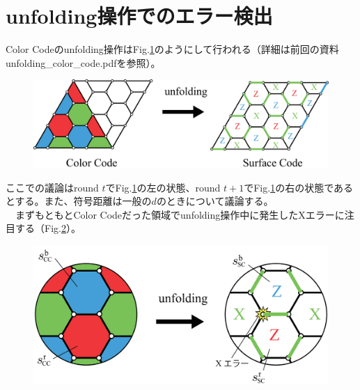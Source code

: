 \documentclass[a4paper,9pt]{ltjsarticle}
\begin{document}
\section{unfolding操作でのエラー検出}{
    Color Codeのunfolding操作はFig.\ref{figure2}のようにして行われる（詳細は前回の資料unfolding\_color\_code.pdfを参照）。

    \begin{figure}[h]
        \centering
        \includegraphics[scale=0.2]{figure/figure2.eps}
        \caption{ }
        \label{figure2}
    \end{figure}

    ここでの議論はround $t$でFig.\ref{figure2}の左の状態、round $t+1$でFig.\ref{figure2}の右の状態であるとする。また、符号距離は一般の$d$のときについて議論する。\\
    　まずもともとColor Codeだった領域でunfolding操作中に発生したXエラーに注目する（Fig.\ref{figure3}）。

    \begin{figure}[h]
        \centering
        \includegraphics[scale=0.2]{figure/figure3.eps}
        \vspace{-20pt}\caption{ }
        \label{figure3}
    \end{figure}

}
\end{document}
